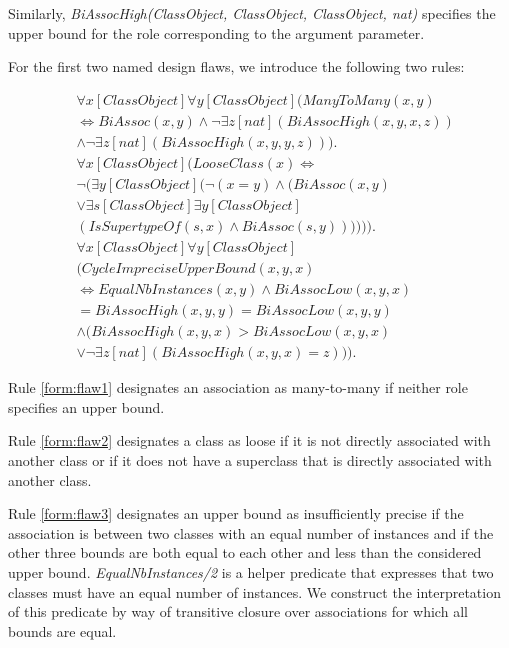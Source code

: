 \documentclass[conference]{IEEEtran}
\begin{document}
Similarly, \textit{BiAssocHigh(ClassObject, ClassObject, ClassObject, nat)} specifies the upper bound for the role corresponding to the argument parameter.

For the first two named design flaws, we introduce the following two rules:

\begin{align}
	\nonumber &\forall{x}[ClassObject]\forall{y}[ClassObject](ManyToMany(x, y) \\ \nonumber &\Leftrightarrow BiAssoc(x, y) \land \lnot \exists{z}[nat](BiAssocHigh(x, y, x, z)) \\ &\land \lnot \exists{z}[nat](BiAssocHigh(x, y, y, z))).\label{form:flaw1} \\
	\nonumber &\forall{x}[ClassObject](LooseClass(x) \Leftrightarrow \\ \nonumber &\lnot (\exists{y}[ClassObject](\lnot(x = y) \land (BiAssoc(x, y) \\ \nonumber  &\lor \exists{s}[ClassObject]\exists{y}[ClassObject]\\ &(IsSupertypeOf(s, x) \land BiAssoc(s, y)))))).\label{form:flaw2} \\
	&\nonumber\forall{x}[ClassObject]\forall{y}[ClassObject] \\
	&\nonumber(CycleImpreciseUpperBound(x, y, x) \\ &\nonumber\Leftrightarrow EqualNbInstances(x, y) \land BiAssocLow(x, y, x) \\ &\nonumber= BiAssocHigh(x, y, y) = BiAssocLow(x, y, y) \\ &\nonumber\land (BiAssocHigh(x, y, x) > BiAssocLow(x, y, x) \\ &\lor \lnot\exists{z}[nat](BiAssocHigh(x, y, x) = z))).\label{form:flaw3}
\end{align}

Rule \ref{form:flaw1} designates an association as many-to-many if neither role specifies an upper bound.

Rule \ref{form:flaw2} designates a class as loose if it is not directly associated with another class or if it does not have a superclass that is directly associated with another class.

Rule \ref{form:flaw3} designates an upper bound as insufficiently precise if the association is between two classes with an equal number of instances and if the other three bounds are both equal to each other and less than the considered upper bound. \textit{EqualNbInstances/2} is a helper predicate that expresses that two classes must have an equal number of instances. We construct the interpretation of this predicate by way of transitive closure over associations for which all bounds are equal.
\end{document}
